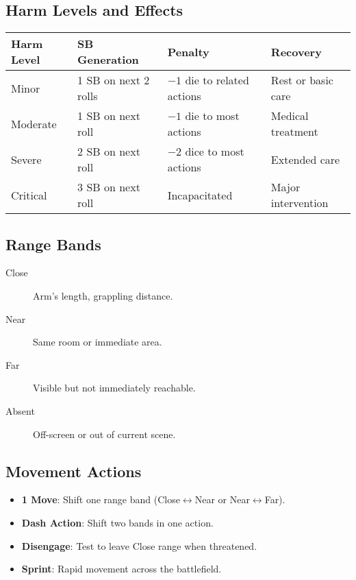\subsection{Harm Levels and Effects}
\label{subsec:harm-ref}

\begin{center}
\feTableStart
\begin{tabularx}{\linewidth}{@{}l l l l @{}}
\toprule
\textbf{Harm Level} & \textbf{SB Generation} & \textbf{Penalty} & \textbf{Recovery} \\
\midrule
Minor & 1 SB on next 2 rolls & $-1$ die to related actions & Rest or basic care \\
Moderate & 1 SB on next roll & $-1$ die to most actions & Medical treatment \\
Severe & 2 SB on next roll & $-2$ dice to most actions & Extended care \\
Critical & 3 SB on next roll & Incapacitated & Major intervention \\
\bottomrule
\end{tabularx}
\feTableEnd
\end{center}

\subsection{Range Bands}
\label{subsec:range-bands-ref}

\begin{description}
\item[Close] Arm's length, grappling distance.
\item[Near] Same room or immediate area.
\item[Far] Visible but not immediately reachable.
\item[Absent] Off-screen or out of current scene.
\end{description}

\subsection{Movement Actions}
\label{subsec:movement-ref}

\begin{itemize}
\item \textbf{1 Move}: Shift one range band (Close$\leftrightarrow$Near or Near$\leftrightarrow$Far).
\item \textbf{Dash Action}: Shift two bands in one action.
\item \textbf{Disengage}: Test to leave Close range when threatened.
\item \textbf{Sprint}: Rapid movement across the battlefield.
\end{itemize}

